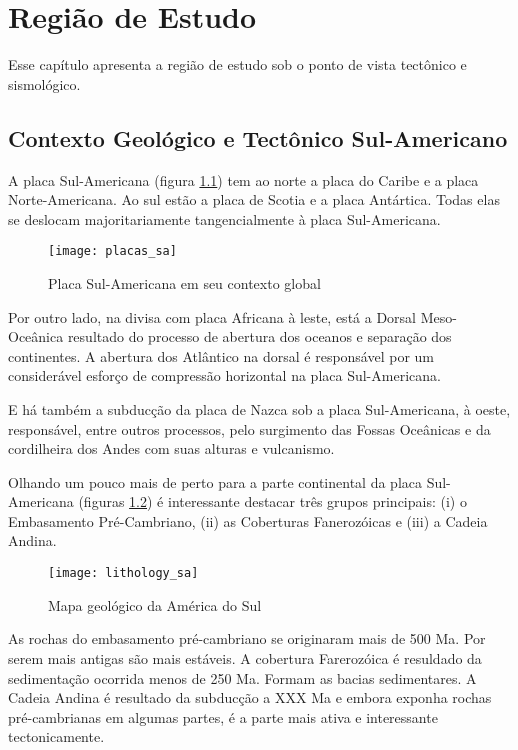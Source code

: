 \chapter{Região de Estudo}
\label{cap:regiao_de_estudo}


Esse capítulo apresenta a região de estudo sob o ponto de vista tectônico e sismológico.

\section{Contexto Geológico e Tectônico Sul-Americano}
\label{sec:03_america_do_sul}

A placa Sul-Americana (figura \ref{fig:sa_plate}) tem ao norte a placa do Caribe e a placa Norte-Americana.
Ao sul estão a placa de Scotia e a placa Antártica. Todas elas se deslocam 
majoritariamente tangencialmente
à placa Sul-Americana.

\begin{figure}[H]
  \centering
  \texttt{[image: placas\_sa]} 
  \caption{Placa Sul-Americana em seu contexto global}
  \label{fig:sa_plate} 
\end{figure}

Por outro lado, na divisa com placa Africana à leste, está a Dorsal Meso-Oceânica resultado
do processo de abertura dos oceanos e separação dos continentes. A abertura dos Atlântico na 
dorsal é responsável por um considerável esforço de compressão horizontal na placa Sul-Americana.

E há também a subducção da placa de Nazca sob a placa Sul-Americana, à oeste,
responsável, entre outros processos, pelo surgimento das Fossas Oceânicas e da
cordilheira dos Andes com suas alturas e vulcanismo.

Olhando um pouco mais de perto para a parte continental da placa Sul-Americana
(figuras \ref{fig:sa_tec}) é interessante destacar três grupos principais: 
(i) o Embasamento Pré-Cambriano, (ii) as Coberturas Fanerozóicas e (iii) a 
Cadeia Andina.

\begin{figure}[H]
  \centering
  \texttt{[image: lithology\_sa]} 
  \caption{Mapa geológico da América do Sul}
  \label{fig:sa_tec} 
\end{figure}

As rochas do embasamento pré-cambriano se originaram mais de 500 Ma. Por serem mais antigas
são mais estáveis. A cobertura Farerozóica é resuldado da sedimentação ocorrida menos de 250 Ma. Formam as bacias
sedimentares. A Cadeia Andina é resultado da subducção a XXX Ma e embora exponha rochas pré-cambrianas
em algumas partes, é a parte mais ativa e interessante tectonicamente.


